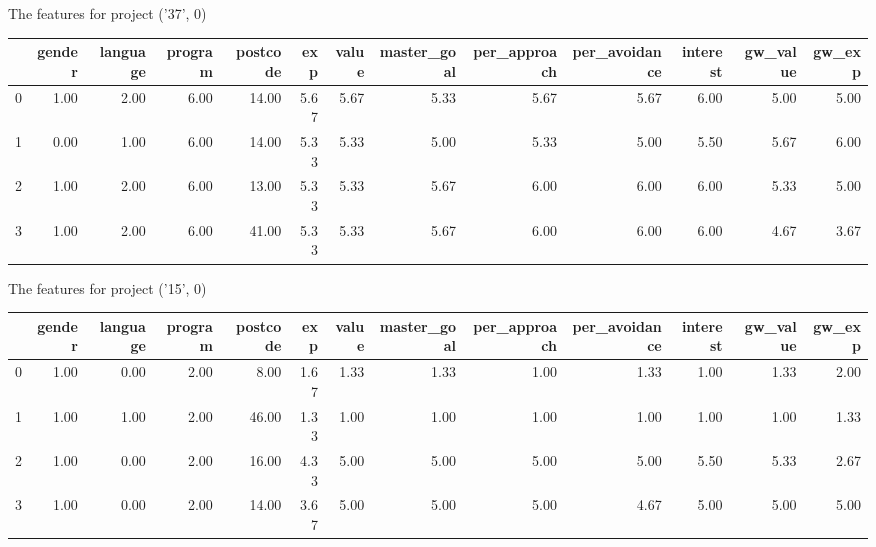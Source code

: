 \documentclass[7pt]{article}
\begin{document}
\begin{landscape}
The features for project ('37', 0)\newline
\begin{tabular}{lrrrrrrrrrrrr}
\toprule
{} &  gender &  language &  program &  postcode &  exp &  value &  master\_goal &  per\_approach &  per\_avoidance &  interest &  gw\_value &  gw\_exp \\
\midrule
0 &    1.00 &      2.00 &     6.00 &     14.00 & 5.67 &   5.67 &         5.33 &          5.67 &           5.67 &      6.00 &             5.00 &           5.00 \\
1 &    0.00 &      1.00 &     6.00 &     14.00 & 5.33 &   5.33 &         5.00 &          5.33 &           5.00 &      5.50 &             5.67 &           6.00 \\
2 &    1.00 &      2.00 &     6.00 &     13.00 & 5.33 &   5.33 &         5.67 &          6.00 &           6.00 &      6.00 &             5.33 &           5.00 \\
3 &    1.00 &      2.00 &     6.00 &     41.00 & 5.33 &   5.33 &         5.67 &          6.00 &           6.00 &      6.00 &             4.67 &           3.67 \\
\bottomrule
\end{tabular}

The features for project ('15', 0)\newline
\begin{tabular}{lrrrrrrrrrrrr}
\toprule
{} &  gender &  language &  program &  postcode &  exp &  value &  master\_goal &  per\_approach &  per\_avoidance &  interest &  gw\_value &  gw\_exp \\
\midrule
0 &    1.00 &      0.00 &     2.00 &      8.00 & 1.67 &   1.33 &         1.33 &          1.00 &           1.33 &      1.00 &             1.33 &           2.00 \\
1 &    1.00 &      1.00 &     2.00 &     46.00 & 1.33 &   1.00 &         1.00 &          1.00 &           1.00 &      1.00 &             1.00 &           1.33 \\
2 &    1.00 &      0.00 &     2.00 &     16.00 & 4.33 &   5.00 &         5.00 &          5.00 &           5.00 &      5.50 &             5.33 &           2.67 \\
3 &    1.00 &      0.00 &     2.00 &     14.00 & 3.67 &   5.00 &         5.00 &          5.00 &           4.67 &      5.00 &             5.00 &           5.00 \\
\bottomrule
\end{tabular}


\end{landscape}
\end{document}
